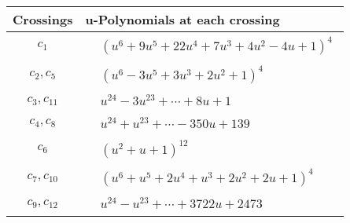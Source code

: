 \documentclass[1p]{elsarticle_modified}
\theoremstyle{definition}
\begin{document}
\begin{tabular}{m{50pt}|m{274pt}}
Crossings & \hspace{64pt}u-Polynomials at each crossing \\
\hline $$\begin{aligned}c_{1}\end{aligned}$$&$\begin{aligned}
&(u^6+9 u^5+22 u^4+7 u^3+4 u^2-4 u+1)^4
\end{aligned}$\\
\hline $$\begin{aligned}c_{2},c_{5}\end{aligned}$$&$\begin{aligned}
&(u^6-3 u^5+3 u^3+2 u^2+1)^4
\end{aligned}$\\
\hline $$\begin{aligned}c_{3},c_{11}\end{aligned}$$&$\begin{aligned}
&u^{24}-3 u^{23}+\cdots+8 u+1
\end{aligned}$\\
\hline $$\begin{aligned}c_{4},c_{8}\end{aligned}$$&$\begin{aligned}
&u^{24}+u^{23}+\cdots-350 u+139
\end{aligned}$\\
\hline $$\begin{aligned}c_{6}\end{aligned}$$&$\begin{aligned}
&(u^2+u+1)^{12}
\end{aligned}$\\
\hline $$\begin{aligned}c_{7},c_{10}\end{aligned}$$&$\begin{aligned}
&(u^6+u^5+2 u^4+u^3+2 u^2+2 u+1)^4
\end{aligned}$\\
\hline $$\begin{aligned}c_{9},c_{12}\end{aligned}$$&$\begin{aligned}
&u^{24}- u^{23}+\cdots+3722 u+2473
\end{aligned}$\\
\hline
\end{tabular}\\~\\
\newpage\renewcommand{\arraystretch}{1}
\end{document}
